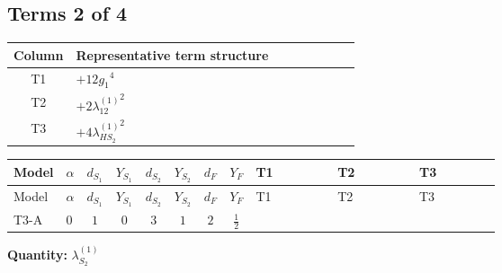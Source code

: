\documentclass[8pt]{article}
\begin{document}
\begin{landscape}
\subsection*{Terms 2 of 4}
\begin{center}
\begin{tabular}{@{}c >{\raggedright\arraybackslash}p{0.82\linewidth}@{}}
\toprule
Column & Representative term structure \\
\midrule
T1 & \(\displaystyle +12 {g_1}^4\) \\
\midrule
T2 & \(\displaystyle +2 {\lambda_{12}^{(1)}}^2\) \\
\midrule
T3 & \(\displaystyle +4 {\lambda_{HS_2}^{(1)}}^2\) \\
\midrule
\bottomrule
\end{tabular}
\end{center}
\smallskip
\tiny
\begin{longtable}{@{}llcccccc >{\raggedright\arraybackslash}p{0.21\linewidth} >{\raggedright\arraybackslash}p{0.21\linewidth} >{\raggedright\arraybackslash}p{0.21\linewidth}@{}}
\toprule
Model & $\alpha$ & $d_{S_1}$ & $Y_{S_1}$ & $d_{S_2}$ & $Y_{S_2}$ & $d_F$ & $Y_F$ & T1 & T2 & T3 \\
\midrule
\endfirsthead
\toprule
Model & $\alpha$ & $d_{S_1}$ & $Y_{S_1}$ & $d_{S_2}$ & $Y_{S_2}$ & $d_F$ & $Y_F$ & T1 & T2 & T3 \\
\midrule
\endhead
T3-A & $0$ & $1$ & $0$ & $3$ & $1$ & $2$ & $\frac{1}{2}$ & \scriptsize\adjustbox{max width=\linewidth}{$\begin{gathered} +12 {g_1}^4\end{gathered}$} & \scriptsize\adjustbox{max width=\linewidth}{$\begin{gathered} +2 {\lambda_{12}^{(1)}}^2\end{gathered}$} & \scriptsize\adjustbox{max width=\linewidth}{$\begin{gathered} +4 {\lambda_{HS_2}^{(1)}}^2\end{gathered}$} \\
\midrule
\bottomrule
\end{longtable}
\clearpage
\noindent\textbf{Quantity: }$\lambda_{S_2}^{(1)}$\par\smallskip

\end{landscape}
\end{document}
